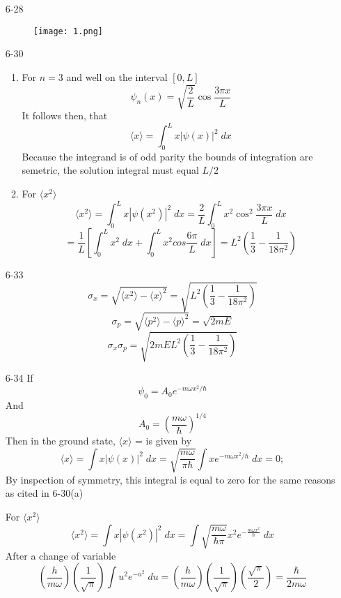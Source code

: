 \documentclass[]{2620hw}
\begin{document}
\maketitle

\begin{enumerate}
    \item [6-28] ~
	\begin{figure}[ht!]
	\begin{center}
		\texttt{[image: 1.png]}
	\end{center}
	\end{figure}
	


	\item [6-30]
	\begin{enumerate}
	    \item For $n = 3$ and well on the interval $[0, L]$
		\[
			\psi_n(x) = \sqrt{ \frac{2}{L} }\cos \frac{3 \pi x}{L} 
		\]
		It follows then, that 
		\[
			\langle x \rangle = \int_0^L x|\psi(x)|^2 \; dx
		\]
		Because the integrand is of odd parity the bounds of integration are semetric, the solution integral must equal $L / 2$
		\item For $\langle x^2 \rangle$
		\[
			\langle x^2 \rangle = \int_0^L x|\psi(x^2)|^2 \; dx = \frac{2}{L} \int_0^L x^2 \cos^2 \frac{3 \pi x}{L} \; dx
		\]
		\[
			= \frac{1}{L} \left[ \int_0^L x^2 \; dx + \int_0^L x^2 cos \frac{6 \pi}{L} \; dx \right] = L^2 \left( \frac{1}{3} - \frac{1}{18\pi^2} \right)
		\] 
		
	\end{enumerate}

\item [6-33]
	\[
		\sigma_x = \sqrt{ \langle x^2 \rangle  - \langle x \rangle^2 } = \sqrt{ L^2 \left( \frac{1}{3} - \frac{1}{18\pi^2} \right) } 
	\]
	\[
		\sigma_p = \sqrt{ \langle p^2 \rangle  - \langle p \rangle^2 } = \sqrt{ 2mE }
	\]
	\[
		\sigma_x \sigma_p = \sqrt{ 2mEL^2 \left( \frac{1}{3} - \frac{1}{18\pi^2} \right) }
	\]
	\item [6-34] 
	If
	\[
		\psi_0 = A_0 e^{- m \omega x^2 / \hbar}
	\]
	And 
	\[
		A_0 = \left( \frac{m \omega }{\hbar} \right)^{1/4}
	\]
	Then in the ground state, $\langle x \rangle$ = is given by
	\[
		\langle x \rangle = \int x|\psi(x)|^2 \; dx = \sqrt{ \frac{m \omega}{\pi \hbar} } \int x e^{ - m \omega x^2 / \hbar} \; dx	= 0;
	\]
	By inspection of symmetry, this integral is equal to zero for the same reasons as cited in  6-30(a)
	
	For $\langle x^2 \rangle$
		\[
			\langle x^2 \rangle = \int x|\psi(x^2)|^2 \; dx = \int \sqrt{ \frac{m \omega}{\hbar \pi}} x^2e^{- \frac{m\omega x^2}{\hbar}} \; dx 
		\]
		After a change of variable 
		\[
			\left( \frac{h}{m \omega} \right) \left( \frac{1}{\sqrt{\pi}}\right) \int u^2 e^{-u^2} \; du = \left( \frac{h}{m \omega} \right) \left( \frac{1}{\sqrt{\pi}}\right) \left( \frac{\sqrt{\pi}}{2} \right) = \frac{\hbar}{2m\omega}
		\]



\end{enumerate}
\end{document}
